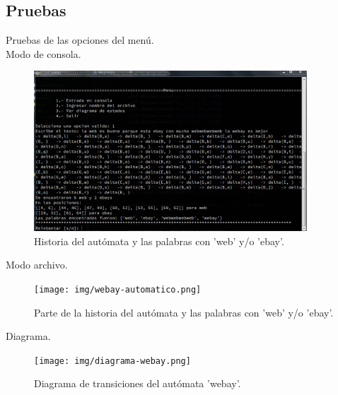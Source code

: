 	\subsection{Pruebas}
	Pruebas de las opciones del menú.
	\\
	{\large Modo de consola.}
	\begin{figure}[H]
		\begin{center}
			\includegraphics[width=\linewidth, height=6cm]{img/webay-manual.png}
			\caption{Historia del autómata y las palabras con 'web' y/o 'ebay'.}
			\label{fig:webay1}
		\end{center}
	\end{figure}
	{\large Modo archivo.}
	\begin{figure}[H]
		\begin{center}
			\texttt{[image: img/webay-automatico.png]}
			\caption{Parte de la historia del autómata y las palabras con 'web' y/o 'ebay'.}
			\label{fig:webay2}
		\end{center}
	\end{figure}
	{\large Diagrama.}
	\begin{figure}[H]
		\begin{center}
			\texttt{[image: img/diagrama-webay.png]}
			\caption{Diagrama de transiciones del autómata 'webay'.}
			\label{fig:webay3}
		\end{center}
	\end{figure}